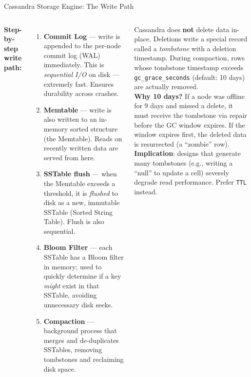 \documentclass[aspectratio=169]{beamer}
\begin{document}
\begin{frame}{Cassandra Storage Engine: The Write Path}
  \begin{columns}[T]
      \small
      \textbf{Step-by-step write path:}
      \begin{enumerate}
        \item \textbf{Commit Log} — write is appended to the per-node commit log (WAL) immediately. This is \textit{sequential I/O} on disk — extremely fast. Ensures durability across crashes.
        \item \textbf{Memtable} — write is also written to an in-memory sorted structure (the Memtable). Reads on recently written data are served from here.
        \item \textbf{SSTable flush} — when the Memtable exceeds a threshold, it is \textit{flushed} to disk as a new, immutable SSTable (Sorted String Table). Flush is also sequential.
        \item \textbf{Bloom Filter} — each SSTable has a Bloom filter in memory; used to quickly determine if a key \textit{might} exist in that SSTable, avoiding unnecessary disk seeks.
        \item \textbf{Compaction} — background process that merges and de-duplicates SSTables, removing tombstones and reclaiming disk space.
      \end{enumerate}
      \begin{tcolorbox}[deepdivebox, title={Deep Dive: Tombstones}]
        \scriptsize
        Cassandra does \textbf{not} delete data in-place. Deletions write a special record called a \textit{tombstone} with a deletion timestamp. During compaction, rows whose tombstone timestamp exceeds \texttt{gc\_grace\_seconds} (default: 10 days) are actually removed.
        \vspace{0.1cm}\\
        \textbf{Why 10 days?} If a node was offline for 9 days and missed a delete, it must receive the tombstone via repair before the GC window expires. If the window expires first, the deleted data is resurrected (a ``zombie'' row).
        \vspace{0.1cm}\\
        \textbf{Implication}: designs that generate many tombstones (e.g., writing a ``null'' to update a cell) severely degrade read performance. Prefer \texttt{TTL} instead.
      \end{tcolorbox}
  \end{columns}
\end{frame}
\end{document}
